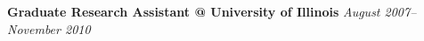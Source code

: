 \documentclass[12pt]{article}
\makeatletter
\newcommand{\jobitem}[4]{
    \vspace{5pt}

    \textbf{#1 @ #2} \hfill \textit{#3} %

    \vspace{-5pt}
}
\makeatother
\begin{document}



\vspace{-6pt}
\jobitem{Graduate Research Assistant}{University of Illinois}{August 2007--November 2010}{Urbana, IL}
\end{document}
